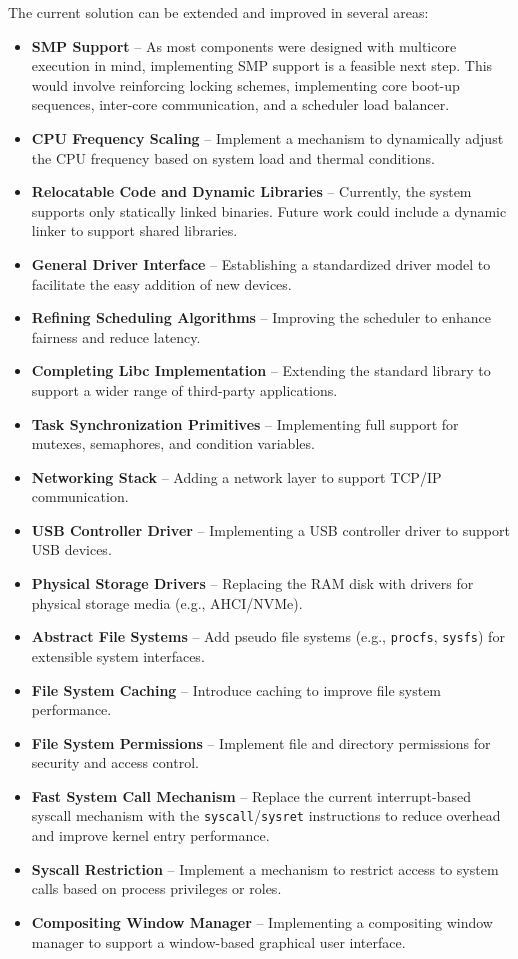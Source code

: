\documentclass[a4paper,10pt,twoside]{report}
\theoremstyle{definition}
\begin{document}
The current solution can be extended and improved in several areas: 
\begin{itemize} 
    \item \textbf{SMP Support} -- As most components were designed with multicore execution in mind, implementing SMP support is a feasible next step. This would involve reinforcing locking schemes, implementing core boot-up sequences, inter-core communication, and a scheduler load balancer. 
    \item \textbf{CPU Frequency Scaling} -- Implement a mechanism to dynamically adjust the CPU frequency based on system load and thermal conditions.
    \item \textbf{Relocatable Code and Dynamic Libraries} -- Currently, the system supports only statically linked binaries. Future work could include a dynamic linker to support shared libraries. 
    \item \textbf{General Driver Interface} -- Establishing a standardized driver model to facilitate the easy addition of new devices. 
    \item \textbf{Refining Scheduling Algorithms} -- Improving the scheduler to enhance fairness and reduce latency. 
    \item \textbf{Completing Libc Implementation} -- Extending the standard library to support a wider range of third-party applications. 
    \item \textbf{Task Synchronization Primitives} -- Implementing full support for mutexes, semaphores, and condition variables.
    \item \textbf{Networking Stack} -- Adding a network layer to support TCP/IP communication.
    \item \textbf{USB Controller Driver} -- Implementing a USB controller driver to support USB devices.
    \item \textbf{Physical Storage Drivers} -- Replacing the RAM disk with drivers for physical storage media (e.g., AHCI/NVMe). 
    \item \textbf{Abstract File Systems} -- Add pseudo file systems (e.g., \texttt{procfs}, \texttt{sysfs}) for extensible system interfaces.
    \item \textbf{File System Caching} -- Introduce caching to improve file system performance.
    \item \textbf{File System Permissions} -- Implement file and directory permissions for security and access control.
    \item \textbf{Fast System Call Mechanism} -- Replace the current interrupt-based syscall mechanism with the \texttt{syscall}/\texttt{sysret} instructions to reduce overhead and improve kernel entry performance.
    \item \textbf{Syscall Restriction} -- Implement a mechanism to restrict access to system calls based on process privileges or roles.
    \item \textbf{Compositing Window Manager} -- Implementing a compositing window manager to support a window-based graphical user interface.
\end{itemize}
\end{document}
